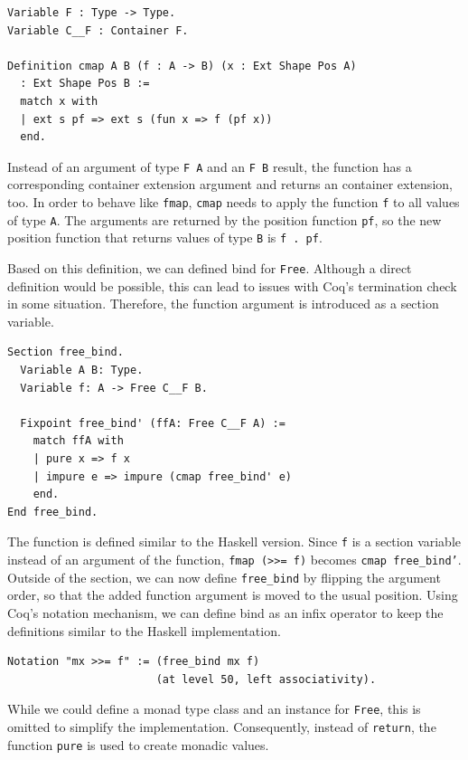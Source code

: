 \documentclass[a4paper, 11pt, fleqn, twoside]{scrreprt}
\newcommand{\hinl}[1]{\texttt{#1}}
\newcommand{\cinl}[1]{\texttt{#1}}
\begin{document}
\begin{verbatim}
Variable F : Type -> Type.
Variable C__F : Container F.

Definition cmap A B (f : A -> B) (x : Ext Shape Pos A) 
  : Ext Shape Pos B :=
  match x with
  | ext s pf => ext s (fun x => f (pf x))
  end.
\end{verbatim}

Instead of an argument of type \cinl{F A} and an \cinl{F B} result, the function has a corresponding container extension argument and returns an container extension, too.
In order to behave like \hinl{fmap}, \cinl{cmap} needs to apply the function \cinl{f} to all values of type \cinl{A}.
The arguments are returned by the position function \cinl{pf}, so the new position function that returns values of type \cinl{B} is \cinl{f . pf}.

Based on this definition, we can defined bind for \cinl{Free}.
Although a direct definition would be possible, this can lead to issues with Coq's termination check in some situation.
Therefore, the function argument is introduced as a section variable.

\begin{verbatim}
Section free_bind.
  Variable A B: Type.
  Variable f: A -> Free C__F B.

  Fixpoint free_bind' (ffA: Free C__F A) :=
    match ffA with
    | pure x => f x
    | impure e => impure (cmap free_bind' e)
    end.
End free_bind.
\end{verbatim}

The function is defined similar to the Haskell version.
Since \cinl{f} is a section variable instead of an argument of the function, \hinl{fmap (>>= f)} becomes \cinl{cmap free_bind'}.
Outside of the section, we can now define \cinl{free_bind} by flipping the argument order, so that the added function argument is moved to the usual position.
Using Coq's notation mechanism, we can define bind as an infix operator to keep the definitions similar to the Haskell implementation.

\begin{verbatim}
Notation "mx >>= f" := (free_bind mx f)
                       (at level 50, left associativity).
\end{verbatim}

While we could define a monad type class and an instance for \cinl{Free}, this is omitted to simplify the implementation.
Consequently, instead of \hinl{return}, the function \cinl{pure} is used to create monadic values.
\end{document}
